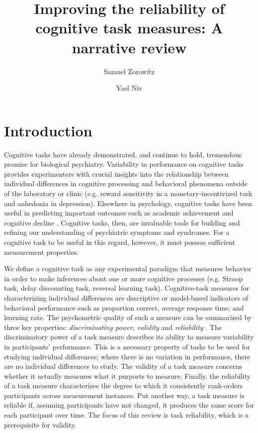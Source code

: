 \documentclass[a4paper,notitlepage,12pt]{article}
\author[1]{Samuel Zorowitz}
\author[1,2]{Yael Niv}
\affil[1]{Princeton Neuroscience Institute, Princeton University, USA}
\affil[2]{Department of Psychology, Princeton University, USA}
\title{Improving the reliability of cognitive task measures: A narrative review}
\date{}
\begin{document}
\maketitle

\section{Introduction}


Cognitive tasks have already demonstrated, and continue to hold, tremendous promise for biological psychiatry. Variability in performance on cognitive tasks provides experimenters with crucial insights into the relationship between individual differences in cognitive processing and behavioral phenomena outside of the laboratory or clinic (e.g. reward sensitivity in a monetary-incentivized task and anhedonia in depression). Elsewhere in psychology, cognitive tasks have been useful in predicting important outcomes such as academic achievement \cite{spiegel2021relations} and cognitive decline \cite{hartshorne2015does}. Cognitive tasks, then, are invaluable tools for building and refining our understanding of psychiatric symptoms and syndromes. For a cognitive task to be useful in this regard, however, it must possess sufficient measurement properties. 


We define a cognitive task as any experimental paradigm that measures behavior in order to make inferences about one or more cognitive processes (e.g. Stroop task, delay discounting task, reversal learning task). Cognitive-task measures for characterizing individual differences are descriptive or model-based indicators of behavioral performance such as proportion correct, average response time, and learning rate. The psychometric quality of such a measure can be summarized by three key properties: \emph{discriminating power}, \emph{validity} and \emph{reliability} \cite{kline2015handbook}. The discriminatory power of a task measure describes its ability to measure variability in participants' performance. This is a necessary property of tasks to be used for studying individual differences; where there is no variation in performance, there are no individual differences to study. The validity of a task measure concerns whether it actually measures what it purports to measure. Finally, the reliability of a task measure characterizes the degree to which it consistently rank-orders participants across measurement instances. Put another way, a task measure is reliable if, assuming participants have not changed, it produces the same score for each participant over time. The focus of this review is task reliability, which is a prerequisite for validity. 
\end{document}
